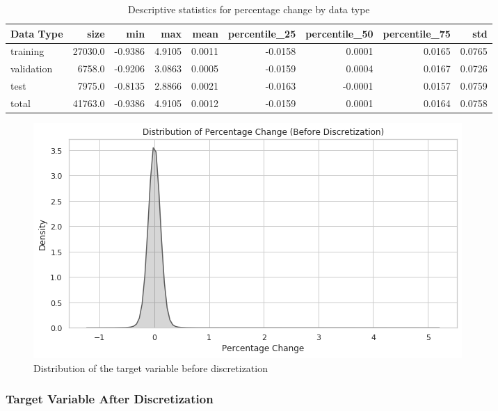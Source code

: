 \documentclass{article}
\begin{document}
	
	\begin{table}[h!]
		\centering
		\caption{Descriptive statistics for percentage change by data type}
		\label{table:stats_by_data}
		
		\begin{tabular}{lrrrrrrrr}
			\toprule
			Data Type &     size &     min &     max &    mean &  percentile\_25 &  percentile\_50 &  percentile\_75 &     std \\
			\midrule
			training   &  27030.0 & -0.9386 &  4.9105 &  0.0011 &        -0.0158 &         0.0001 &         0.0165 &  0.0765 \\
			validation &   6758.0 & -0.9206 &  3.0863 &  0.0005 &        -0.0159 &         0.0004 &         0.0167 &  0.0726 \\
			test       &   7975.0 & -0.8135 &  2.8866 &  0.0021 &        -0.0163 &        -0.0001 &         0.0157 &  0.0759 \\
			total      &  41763.0 & -0.9386 &  4.9105 &  0.0012 &        -0.0159 &         0.0001 &         0.0164 &  0.0758 \\
			\bottomrule
		\end{tabular}
		
	\end{table}%
	
	
	\begin{figure}[h!]
		\includegraphics[width=\linewidth]{img/dist_target_nondisc.png}
		\caption{Distribution of the target variable before discretization}
		\label{fig:dist_target_nondisc}
	\end{figure}

	\subsubsection{Target Variable After Discretization}
		
\end{document}
